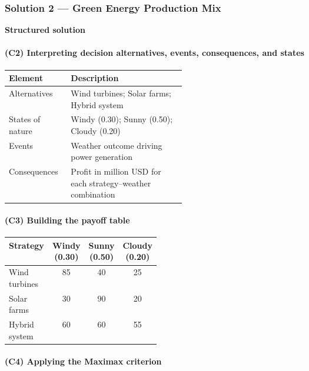 \subsubsection{Solution 2 --- Green Energy Production Mix}\label{subsec:practice-activity-1-solution-2}

\textbf{Structured solution}

\paragraph{(C2) Interpreting decision alternatives, events, consequences, and states}\label{subsubsec:practice-activity-1-solution-2-c2}

\begin{center}
	\begin{tabularx}{\linewidth}{@{}L{0.35\linewidth}Y@{}}
		\toprule
		Element & Description \\
		\midrule
		Alternatives & Wind turbines; Solar farms; Hybrid system \\
		States of nature & Windy (0.30); Sunny (0.50); Cloudy (0.20) \\
		Events & Weather outcome driving power generation \\
		Consequences & Profit in million USD for each strategy--weather combination \\
		\bottomrule
	\end{tabularx}
\end{center}

\paragraph{(C3) Building the payoff table}\label{subsubsec:practice-activity-1-solution-2-c3}

\begin{center}
	\begin{tabularx}{\linewidth}{@{}L{0.3\linewidth}C C C@{}}
		\toprule
		Strategy & Windy (0.30) & Sunny (0.50) & Cloudy (0.20) \\
		\midrule
		Wind turbines & 85 & 40 & 25 \\
		Solar farms & 30 & 90 & 20 \\
		Hybrid system & 60 & 60 & 55 \\
		\bottomrule
	\end{tabularx}
\end{center}

\paragraph{(C4) Applying the Maximax criterion}\label{subsubsec:practice-activity-1-solution-2-c4}

